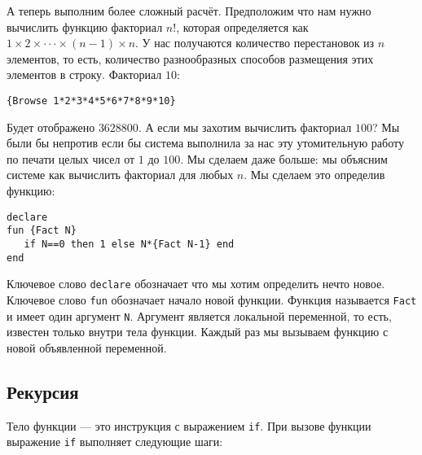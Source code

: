 А теперь выполним более сложный расчёт. Предположим что нам нужно вычислить функцию факториал $n!$, которая определяется как $1 \times 2 \times \cdot \cdot \cdot \times (n-1) \times n$. У нас получаются количество перестановок из $n$ элементов, то есть, количество разнообразных способов размещения этих элементов в строку. Факториал $10$:

\begin{lstlisting}
{Browse 1*2*3*4*5*6*7*8*9*10}
\end{lstlisting}

Будет отображено $3628800$. А если мы захотим вычислить факториал $100$? Мы были бы непротив если бы система выполнила за нас эту утомительную работу по печати целых чисел от $1$ до $100$. Мы сделаем даже больше: мы объясним системе как вычислить факториал для любых $n$. Мы сделаем это определив функцию:

\begin{lstlisting}
declare
fun {Fact N}
   if N==0 then 1 else N*{Fact N-1} end
end
\end{lstlisting}

Ключевое слово \lstinline|declare| обозначает что мы хотим определить нечто новое. Ключевое слово \lstinline|fun| обозначает начало новой функции. Функция называется \lstinline|Fact| и имеет один аргумент \lstinline|N|. Аргумент является локальной переменной, то есть, известен только внутри тела функции. Каждый раз мы вызываем функцию с новой объявленной переменной.

\subsection{Рекурсия}

Тело функции --- это инструкция с выражением \lstinline|if|. При вызове функции выражение \lstinline|if| выполняет следующие шаги:

